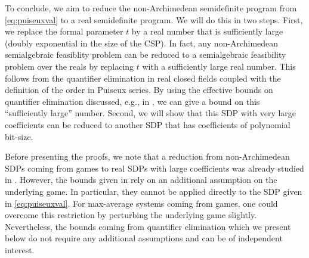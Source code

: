 \documentclass[11pt]{article}
\theoremstyle{definition}
\theoremstyle{remark}
\begin{document}
To conclude, we aim to reduce the non-Archimedean semidefinite program from \cref{eq:puiseuxval} to a real semidefinite program. 
We will do this in two steps. First, we replace the formal parameter $t$ by a real number that is sufficiently large (doubly exponential in the size of the CSP). In fact, any non-Archimedean semialgebraic feasiblity problem can be reduced to a semialgebraic feasibility problem over the reals by replacing $t$ with a sufficiently large real number. This follows 
from the quantifier elimination in real closed fields coupled with the definition of the order in Puiseux series. By using the effective bounds on quantifier elimination discussed, e.g., in \cite{basu_pollack_roy_algorithms}, we can give a bound on this ``sufficiently large'' number. Second, we will show that this SDP with very large coefficients can be reduced to another SDP that has coefficients of polynomial bit-size. 

Before presenting the proofs, we note that a reduction from non-Archimedean SDPs coming from games to real SDPs with large coefficients was already studied in \cite[Theorem~36]{issac2016jsc}. However, the bounds given in \cite{issac2016jsc} rely on an additional assumption on the underlying game. In particular, they cannot be applied directly to the SDP given in \cref{eq:puiseuxval}. For max-average systems coming from games, one could overcome this restriction by perturbing the underlying game slightly. Nevertheless, the bounds coming from quantifier elimination which we present below do not require any additional assumptions and can be of independent interest.
\end{document}
